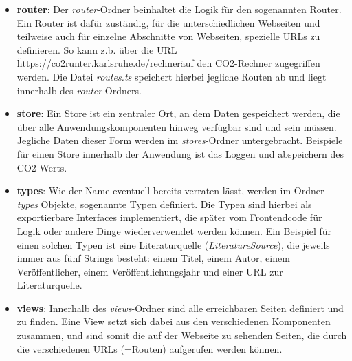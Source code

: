 \begin{itemize}
    \item \textbf{router}: Der \textit{router}-Ordner beinhaltet die Logik für den sogenannten Router. Ein Router ist dafür zuständig, für die unterschiedlichen Webseiten und teilweise auch für einzelne Abschnitte von Webseiten, spezielle URLs zu definieren. So kann z.b. über die URL \"https://co2runter.karlsruhe.de/rechner\" auf den CO2-Rechner zugegriffen werden. Die Datei \textit{routes.ts} speichert hierbei jegliche Routen ab und liegt innerhalb des \textit{router}-Ordners.
    \item \textbf{store}: Ein Store ist ein zentraler Ort, an dem Daten gespeichert werden, die über alle Anwendungskomponenten hinweg verfügbar sind und sein müssen. Jegliche Daten dieser Form werden im \textit{stores}-Ordner untergebracht. Beispiele für einen Store innerhalb der Anwendung ist das Loggen und abspeichern des CO2-Werts.
    \item \textbf{types}: Wie der Name eventuell bereits verraten lässt, werden im Ordner \textit{types} Objekte, sogenannte Typen definiert. Die Typen sind hierbei als exportierbare Interfaces implementiert, die später vom Frontendcode für Logik oder andere Dinge wiederverwendet werden können. Ein Beispiel für einen solchen Typen ist eine Literaturquelle (\textit{LiteratureSource}), die jeweils immer aus fünf Strings besteht: einem Titel, einem Autor, einem Veröffentlicher, einem Veröffentlichungsjahr und einer URL zur Literaturquelle.
    \item \textbf{views}: Innerhalb des \textit{views}-Ordner sind alle erreichbaren Seiten definiert und zu finden. Eine View setzt sich dabei aus den verschiedenen Komponenten zusammen, und sind somit die auf der Webseite zu sehenden Seiten, die durch die verschiedenen URLs (=Routen) aufgerufen werden können.
\end{itemize}

